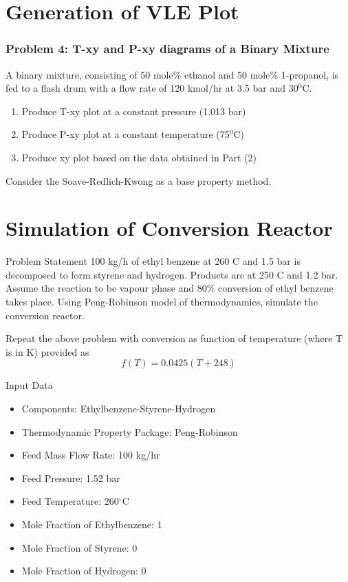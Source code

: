 \documentclass[10pt]{beamer}
\begin{document}
\section{Generation of VLE Plot}
\begin{frame}
\frametitle{Problem 4: T-xy and P-xy diagrams of a Binary Mixture}

A binary mixture, consisting of 50 mole\% ethanol and 50 mole\% 1-propanol, is fed to a flash drum with a flow rate of 120 kmol/hr at 3.5 bar and 30$^0$C.
\begin{enumerate}
\item Produce T-xy plot at a constant pressure (1.013 bar)
\item Produce P-xy plot at a constant temperature (75$^0$C)
\item Produce xy plot based on the data obtained in Part (2)
\end{enumerate}

Consider the Soave-Redlich-Kwong as a base property method.

\end{frame}

\section{Simulation of Conversion Reactor}
\begin{frame}{Problem Statement}
	100 kg/h of ethyl benzene at 260 \degree C and 1.5 bar is decomposed to form styrene and hydrogen. Products are at 250 \degree C and 1.2 bar. Assume the reaction to be vapour phase and 80\% conversion of ethyl benzene takes place. Using Peng-Robinson model of thermodynamics, simulate the conversion reactor.
	
	\vspace{3ex}
	
	Repeat the above problem with conversion as function of temperature (where T is in K) provided as 
	\begin{equation*}
		f(T) = 0.0425(T+248)
	\end{equation*}
\end{frame}

\begin{frame}{Input Data}
	\begin{itemize}
		\item Components: Ethylbenzene-Styrene-Hydrogen
		\item Thermodynamic Property Package: Peng-Robinson
		\item Feed Mass Flow Rate: 100 kg/hr
		\item Feed Pressure: 1.52 bar
		\item Feed Temperature: 260$^\circ$C
		\item Mole Fraction of Ethylbenzene: 1
		\item Mole Fraction of Styrene: 0
		\item Mole Fraction of Hydrogen: 0
	\end{itemize}
\end{frame}
\end{document}
